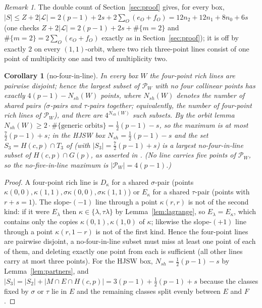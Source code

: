 \documentclass[11pt]{article}
\newtheorem{corollary}[theorem]{Corollary}
\theoremstyle{remark}
\newtheorem{remark}[theorem]{Remark}
\newcommand{\Hc}{H(c,p)}
\newcommand{\Gp}{G(p)}
\newcommand{\Lc}{\mathcal{L}}
\newcommand{\Pset}{\mathcal{P}}
\begin{document}
\begin{remark}
The double count of Section~\ref{sec:proof} gives, for every box, $|S|\le Z+2|\Lc|=2(p-1)+2s+2\sum_O(e_O+f_O)=12n_2+12n_1+8n_0+6s$
(one checks $Z+2|\Lc|=2(p-1)+2s+\#\{m=2\}$ and $\#\{m=2\}=2\sum_O(e_O+f_O)$ exactly as in Section~\ref{sec:proof}); it is
off by exactly $2$ on every $(1,1)$-orbit, where two rich three-point lines consist of one point of multiplicity one and two
of multiplicity two.
\end{remark}

\begin{corollary}[no-four-in-line]\label{cor:no4}
In every box $W$ the four-point rich lines are pairwise disjoint; hence the largest subset of $\Pset_W$ with no four
collinear points has exactly $4(p-1)-N_{sh}(W)$ points, where $N_{sh}(W)$ denotes the number of shared pairs ($\sigma$-pairs
and $\tau$-pairs together; equivalently, the number of four-point rich lines of $\Pset_W$), and there are
$4^{N_{sh}(W)}$ such subsets.  By the orbit lemma $N_{sh}(W)\ge2\cdot\#\{\text{generic orbits}\}=\tfrac12(p-1)-s$, so the
maximum is at most $\tfrac72(p-1)+s$; in the HJSW box $N_{sh}=\tfrac12(p-1)-s$ and the set $S_3=\Hc\cap T_3$ of
\cite[Constr.~2.10]{KNS25} (with $|S_3|=\tfrac72(p-1)+s$) is a largest no-four-in-line subset of $\Hc\cap\Gp$, as asserted in
\cite[App.~A]{KNS25}.  (No line carries five points of $\Pset_W$, so the no-five-in-line maximum is $|\Pset_W|=4(p-1)$.)
\end{corollary}

\begin{proof}
A four-point rich line is $D_\kappa$ for a shared $\sigma$-pair (points $\kappa(0,0),\kappa(1,1),\sigma\kappa(0,0),\sigma\kappa(1,1)$)
or $E_\kappa$ for a shared $\tau$-pair (points with $r+s=1$).  The slope-$(-1)$ line through a point $\kappa(r,r)$ is not of
the second kind: if it were $E_\lambda$ then $\kappa\in\{\lambda,\tau\lambda\}$ by Lemma~\ref{lem:lagrange}, so $E_\lambda=E_\kappa$,
which contains only the copies $\kappa(0,1),\kappa(1,0)$ of $\kappa$; likewise the slope-$(+1)$ line through a point
$\kappa(r,1-r)$ is not of the first kind.  Hence the four-point lines are pairwise disjoint, a
no-four-in-line subset must miss at least one point of each of them, and deleting exactly one point from each is
sufficient (all other lines carry at most three points).  For the HJSW box, $N_{sh}=\tfrac12(p-1)-s$ by
Lemma~\ref{lem:partners}, and $|S_3|=|S_2|+|M\cap E\cap\Hc|=3(p-1)+\tfrac12(p-1)+s$ because the classes fixed by $\sigma$ or
$\tau$ lie in $E$ and the remaining classes split evenly between $E$ and $F$ \cite[Obs.~2.9]{KNS25}.
\end{proof}
\end{document}
